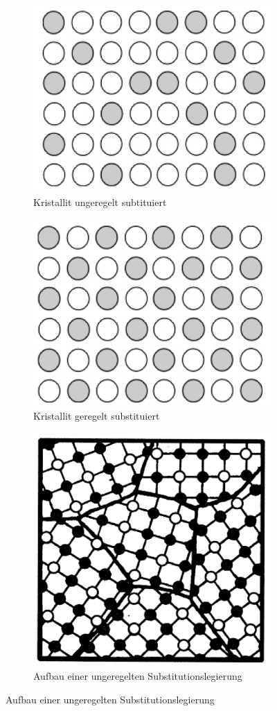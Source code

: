 \begin{figure}[htbp]
	\begin{subfigure}{0.32\linewidth}
		\centering
		\includegraphics[width=0.75\linewidth]{images/3_Subst_1.png}
		\caption{Kristallit ungeregelt subtituiert}
	\end{subfigure}
	\begin{subfigure}{0.32\linewidth}
		\centering
		\includegraphics[width=0.75\linewidth]{images/3_Subst_2.png}
		\caption{Kristallit geregelt substituiert}
	\end{subfigure}
	\begin{subfigure}{0.32\linewidth}
		\centering
		\includegraphics[width=0.75\linewidth]{images/3_Subst_3.png}
		\caption{Aufbau einer ungeregelten Substitutionslegierung}
	\end{subfigure}
\end{figure}

